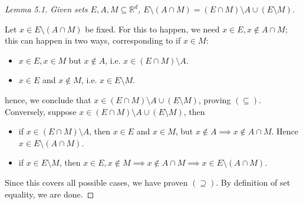 \begin{proof}[Lemma 5.1]
\emph{Given sets \( E, A, M \subseteq \mathbb{R}^{d}  \), \( E \setminus (A \cap M) = (E \cap M) \setminus A \cup ( E \setminus M) \).}

Let \( x \in E \setminus (A \cap M) \) be fixed. For this to happen, we need \( x \in E, x \notin A \cap M \); this can happen in two ways, corresponding to if \( x \in M \):
\begin{itemize}
	\item \( x \in E, x \in M \) but \( x \notin A\), i.e. \( x \in (E \cap M) \setminus A \).
	\item \( x \in E \) and \( x \notin M \), i.e. \( x \in E \setminus M. \)   
\end{itemize}
hence, we conclude that \( x \in (E \cap M)\setminus A \cup (E\setminus M) \), proving \( (\subseteq ) \). Conversely, suppose \( x \in (E \cap M) \setminus A \cup (E \setminus M) \), then
\begin{itemize}
	\item if \( x \in (E \cap M) \setminus A\), then \( x \in E \) and \( x \in M \), but \( x \notin A \implies x \notin A \cap M \). Hence \( x \in E \setminus (A \cap M) \).
	\item if \( x \in E \setminus M \), then \( x \in E, x \notin M \implies x \notin A \cap M \implies x \in E \setminus (A \cap M) \).
	
\end{itemize}
Since this covers all possible cases, we have proven \( (\supseteq) \). By definition of set equality, we are done. 
\end{proof}
